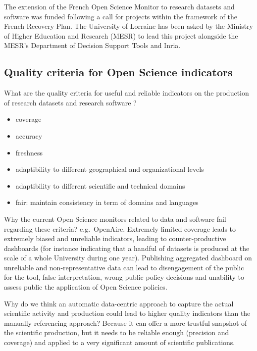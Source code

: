 \documentclass[
]{article}
\begin{document}
The extension of the French Open Science Monitor to research datasets
and software was funded following a call for projects within the
framework of the French Recovery Plan. The University of Lorraine has
been asked by the Ministry of Higher Education and Research (MESR) to
lead this project alongside the MESR's Department of Decision Support
Tools and Inria.

\hypertarget{quality-criteria-for-open-science-indicators}{%
\subsection{Quality criteria for Open Science
indicators}\label{quality-criteria-for-open-science-indicators}}

What are the quality criteria for useful and reliable indicators on the
production of research datasets and research software ?

\begin{itemize}
\item
  coverage
\item
  accuracy
\item
  freshness
\item
  adaptibility to different geographical and organizational levels
\item
  adaptibility to different scientific and technical domains
\item
  fair: maintain consistency in term of domains and languages
\end{itemize}

Why the current Open Science monitors related to data and software fail
regarding these criteria? e.g.~OpenAire. Extremely limited coverage
leads to extremely biased and unreliable indicators, leading to
counter-productive dashboards (for instance indicating that a handful of
datasets is produced at the scale of a whole University during one
year). Publishing aggregated dashboard on unreliable and
non-representative data can lead to disengagement of the public for the
tool, false interpretation, wrong public policy decisions and unability
to assess public the application of Open Science policies.

Why do we think an automatic data-centric approach to capture the actual
scientific activity and production could lead to higher quality
indicators than the manually referencing approach? Because it can offer
a more trustful snapshot of the scientific production, but it needs to
be reliable enough (precision and coverage) and applied to a very
significant amount of scientific publications.
\end{document}
